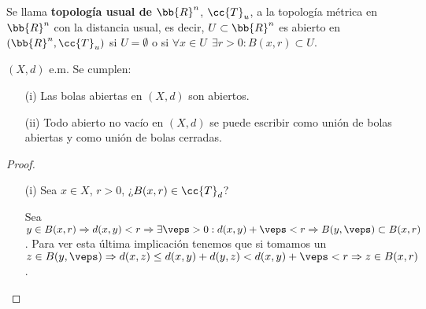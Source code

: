 \begin{definicion}
    Se llama \textbf{topología usual de $\bb{R}^n$}, $\cc{T}_u$, a la topología métrica en $\bb{R}^n$ con la distancia usual, es decir,
    $U \subset \bb{R}^n$ es abierto en $(\bb{R}^n, \cc{T}_u)$ si $U=\emptyset$ o si $\forall x \in U \ \ \exists r>0 : B(x,r) \subset U$.
    \endsquare
\end{definicion}

\begin{prop}
    $(X,d)$ e.m. Se cumplen:
    \begin{enumerate}
        \item[(i)] Las bolas abiertas en $(X,d)$ son abiertos.
        \item[(ii)] Todo abierto no vacío en $(X,d)$ se puede escribir como unión de bolas abiertas y como unión de bolas cerradas.
    \end{enumerate}


    \begin{proof}\
        \begin{enumerate}
            \item[(i)] Sea $x\in X$, $r>0$, ¿$B(x, r)\in \cc{T}_d$?
            
            Sea $y \in B(x,r) \Rightarrow d(x,y)<r \Rightarrow \exists \veps>0 : d(x,y) + \veps <r \Rightarrow B(y, \veps)\subset B(x,r)$. Para ver esta última implicación tenemos que si tomamos un $z \in B(y, \veps)\Rightarrow d(x,z) \leq d(x,y) + d(y,z) < d(x,y) + \veps < r \Rightarrow z \in B(x,r)$.

            \begin{center}
\end{center}
\end{enumerate}
\end{proof}
\end{prop}
